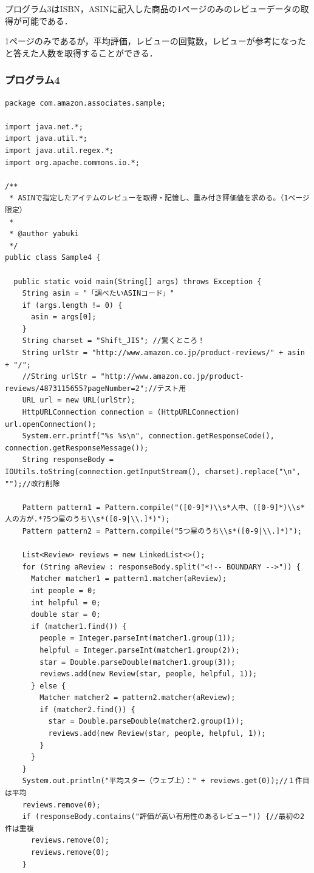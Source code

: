 プログラム3はISBN，ASINに記入した商品の1ページのみのレビューデータの取得が可能である．

1ページのみであるが，平均評価，レビューの回覧数，レビューが参考になったと答えた人数を取得することができる．


\subsubsection{プログラム4}

\begin{lstlisting}
package com.amazon.associates.sample;

import java.net.*;
import java.util.*;
import java.util.regex.*;
import org.apache.commons.io.*;

/**
 * ASINで指定したアイテムのレビューを取得・記憶し、重み付き評価値を求める。（1ページ限定）
 * 
 * @author yabuki
 */
public class Sample4 {

  public static void main(String[] args) throws Exception {
    String asin = "「調べたいASINコード」"
    if (args.length != 0) {
      asin = args[0];
    }
    String charset = "Shift_JIS"; //驚くところ！
    String urlStr = "http://www.amazon.co.jp/product-reviews/" + asin + "/";
    //String urlStr = "http://www.amazon.co.jp/product-reviews/4873115655?pageNumber=2";//テスト用
    URL url = new URL(urlStr);
    HttpURLConnection connection = (HttpURLConnection) url.openConnection();
    System.err.printf("%s %s\n", connection.getResponseCode(), connection.getResponseMessage());
    String responseBody = IOUtils.toString(connection.getInputStream(), charset).replace("\n", "");//改行削除

    Pattern pattern1 = Pattern.compile("([0-9]*)\\s*人中、([0-9]*)\\s*人の方が.*?5つ星のうち\\s*([0-9|\\.]*)");
    Pattern pattern2 = Pattern.compile("5つ星のうち\\s*([0-9|\\.]*)");

    List<Review> reviews = new LinkedList<>();
    for (String aReview : responseBody.split("<!-- BOUNDARY -->")) {
      Matcher matcher1 = pattern1.matcher(aReview);
      int people = 0;
      int helpful = 0;
      double star = 0;
      if (matcher1.find()) {
        people = Integer.parseInt(matcher1.group(1));
        helpful = Integer.parseInt(matcher1.group(2));
        star = Double.parseDouble(matcher1.group(3));
        reviews.add(new Review(star, people, helpful, 1));
      } else {
        Matcher matcher2 = pattern2.matcher(aReview);
        if (matcher2.find()) {
          star = Double.parseDouble(matcher2.group(1));
          reviews.add(new Review(star, people, helpful, 1));
        }
      }
    }
    System.out.println("平均スター（ウェブ上）：" + reviews.get(0));//１件目は平均
    reviews.remove(0);
    if (responseBody.contains("評価が高い有用性のあるレビュー")) {//最初の2件は重複
      reviews.remove(0);
      reviews.remove(0);
    }


\end{lstlisting}
